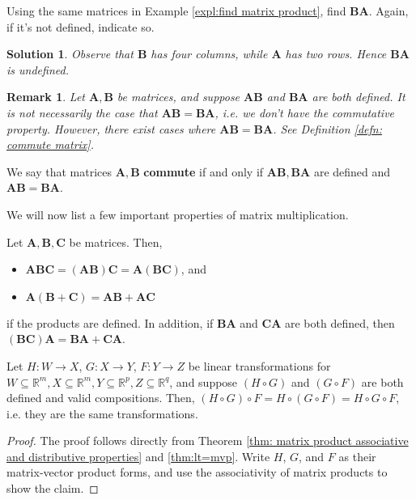 \documentclass[]{book}
\newcommand{\mat}[1]{\ensuremath{\mathbf{#1}}}
\newcommand{\R}{\ensuremath{\mathbb{R}}}
\newtheorem*{solution}{Solution}
\newtheorem*{remark}{Remark}
\begin{document}
\begin{example}
    Using the same matrices in Example \ref{expl:find matrix product}, find $\mat{B}\mat{A}$. Again, if it's not defined, indicate so.
\begin{solution}
    Observe that $\mat{B}$ has four columns, while $\mat{A}$ has two rows. Hence $\mat{B}\mat{A}$ is undefined. \hfill \qedsymbol
\end{solution}

\end{example}

\begin{remark}
    Let $\mat{A},\mat{B}$ be matrices, and suppose $\mat{AB}$ and $\mat{BA}$ are both defined. It is not necessarily the case that $\mat{AB} = \mat{BA}$, i.e. we don't have the commutative property. However, there exist cases where $\mat{AB} = \mat{BA}$. See Definition \ref{defn: commute matrix}.
\end{remark}
\begin{definition}[commute]
    \label{defn: commute matrix}
    We say that matrices $\mat{A},\mat{B}$ \textbf{commute} if and only if $\mat{AB},\mat{BA}$ are defined and $\mat{AB}=\mat{BA}$.
\end{definition}

We will now list a few important properties of matrix multiplication. 
\begin{theorem}
    \label{thm: matrix product associative and distributive properties}
    Let $\mat{A},\mat{B},\mat{C}$ be matrices. Then, 
    \begin{itemize}
        \item $\mat{A}\mat{B}\mat{C} = \left(\mat{A}\mat{B}\right)\mat{C} = \mat{A}\left(\mat{B}\mat{C}\right)$, and
        \item $\mat{A}(\mat{B} + \mat{C}) = \mat{AB} + \mat{AC}$
    \end{itemize}
    if the products are defined. In addition, if $\mat{B}\mat{A}$ and $\mat{C}\mat{A}$ are both defined, then $(\mat{B}\mat{C})\mat{A} = \mat{BA} + \mat{CA}$.
\end{theorem}
\begin{corollary}
    Let $H:W \to X$, $G:X \to Y$, $F: Y \to Z$ be linear transformations for $W \subseteq \R^m,X \subseteq \R^m, Y \subseteq \R^p, Z \subseteq \R^q$, and suppose $(H \circ G)$ and $(G \circ F)$ are both defined and valid compositions. Then, $(H \circ G) \circ F = H \circ (G \circ F) = H \circ G \circ F$, i.e. they are the same transformations.
\begin{proof}
    The proof follows directly from Theorem \ref{thm: matrix product associative and distributive properties} and \ref{thm:lt=mvp}. Write $H$, $G$, and $F$ as their matrix-vector product forms, and use the associativity of matrix products to show the claim.
\end{proof}
\end{corollary}
\end{document}
